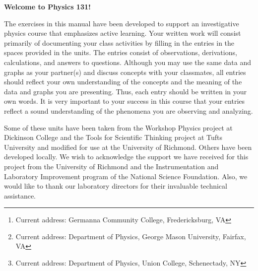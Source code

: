 \author{Emory F. Bunn, 
Mirela Fetea\footnote{Current address: Germanna Community College, Fredericksburg, VA}, 
Gerard P. Gilfoyle, Henry Nebel, \\
Philip D. Rubin\footnote{Current address: Department of Physics, George Mason University, Fairfax, VA}, 
Jack Singal, Matthew L. Trawick, 
and Michael F. Vineyard\footnote{Current address: Department of Physics, Union College, Schenectady, NY}\\[4pt]
Department of Physics, University of Richmond, VA \\[4pt]
}

\maketitle

\vspace{0.8 in}


\begin{center}
\large{\textbf{Welcome to Physics 131!}}
\end{center}

The exercises in this manual have been developed to support an investigative
physics course that emphasizes active learning. 
Your written work will consist primarily of documenting
your class activities by filling in the entries in the spaces provided
in the units. The entries consist of observations, derivations, calculations,
and answers to questions. Although you may use the same data and graphs
as your partner(s) and discuss concepts with your classmates, all
entries should reflect your own understanding of the concepts and
the meaning of the data and graphs you are presenting. Thus, each
entry should be written in your own words. It is very important
to your success in this course that your entries reflect a sound understanding
of the phenomena you are observing and analyzing. 

Some of these units
have been taken from the Workshop Physics project at Dickinson College
and the Tools for Scientific Thinking project at Tufts University
and modified for use at the University of Richmond. Others have been
developed locally. 
We wish to acknowledge the support we have received for this project
from the University of Richmond and the Instrumentation and Laboratory
Improvement program of the National Science Foundation. Also, we would
like to thank our laboratory directors for their invaluable technical
assistance.


